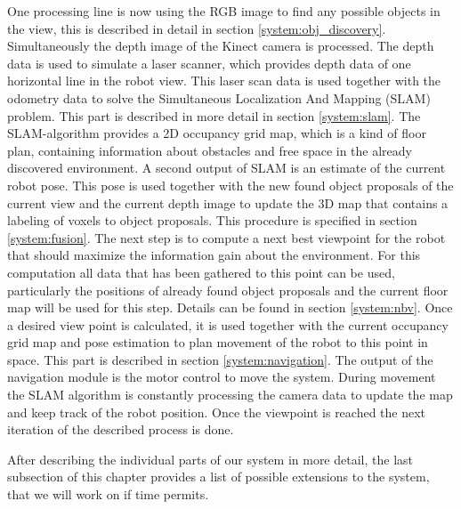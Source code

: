 \documentclass[a4paper,11pt,english]{article}
\begin{document}
One processing line is now using the RGB image to find any possible objects in the view, this is described in detail in section \ref{system:obj_discovery}.
Simultaneously the depth image of the Kinect camera is processed.
The depth data is used to simulate a laser scanner, which provides depth data of one horizontal line in the robot view. 
This laser scan data is used together with the odometry data to solve the Simultaneous Localization And Mapping (SLAM) problem. This part is described in more detail in section \ref{system:slam}.
The SLAM-algorithm provides a 2D occupancy grid map, which is a kind of floor plan, containing information about obstacles and free space in the already discovered environment. A second output of SLAM is an estimate of the current robot pose.
This pose is used together with the new found object proposals of the current view and the current depth image to update the 3D map that contains a labeling of voxels to object proposals. This procedure is specified in section \ref{system:fusion}. 
The next step is to compute a next best viewpoint for the robot that should maximize the information gain about the environment.
For this computation all data that has been gathered to this point can be used, particularly the positions of already found object proposals and the current floor map will be used for this step. Details can be found in section \ref{system:nbv}.
Once a desired view point is calculated, it is used together with the current occupancy grid map and pose estimation to plan movement of the robot to this point in space.
This part is described in section \ref{system:navigation}.
The output of the navigation module is the motor control to move the system.
During movement the SLAM algorithm is constantly processing the camera data to update the map and keep track of the robot position.
Once the viewpoint is reached the next iteration of the described process is done.

After describing the individual parts of our system in more detail, the last subsection of this chapter provides a list of possible extensions to the system, that we will work on if time permits.
\end{document}
